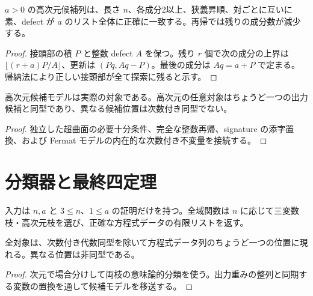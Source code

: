 \begin{theorem}[完全な整数再帰]
\label{thm:higher-enum}
\leanok
$a>0$ の高次元候補列は、長さ $n$、各成分2以上、狭義昇順、対ごとに互いに素、defect が $a$ のリスト全体に正確に一致する。再帰では残りの成分数が減少する。
\end{theorem}
\begin{proof}
\leanok
{}
接頭部の積 $P$ と整数 defect $A$ を保つ。残り $r$ 個で次の成分の上界は $\lfloor(r+a)P/A\rfloor$、更新は $(Pq,Aq-P)$。最後の成分は $Aq=a+P$ で定まる。帰納法により正しい接頭部が全て探索に残ると示す。
\end{proof}

\begin{theorem}[高次元の意味論的分類]
\label{thm:higher-model}
\leanok
高次元候補モデルは実際の対象である。高次元の任意対象はちょうど一つの出力候補と同型であり、異なる候補位置は次数付き同型でない。
\end{theorem}
\begin{proof}
\leanok
{}
独立した超曲面の必要十分条件、完全な整数再帰、signature の添字置換、および Fermat モデルの内在的な次数付き不変量を接続する。
\end{proof}

\section{分類器と最終四定理}

\begin{definition}[公開する全域分類関数]
\label{def:enumerate}
\leanok
{}
入力は $n,a$ と $3\leq n$、$1\leq a$ の証明だけを持つ。全域関数は $n$ に応じて三変数枝・高次元枝を選び、正確な方程式データの有限リストを返す。
\end{definition}

\begin{theorem}[実際の出力方程式への移送]
\label{thm:output}
\leanok
全対象は、次数付き代数同型を除いて方程式データ列のちょうど一つの位置に現れる。異なる位置は非同型である。
\end{theorem}
\begin{proof}
\leanok
{}
次元で場合分けして両枝の意味論的分類を使う。出力重みの整列と同期する変数の置換を通して候補モデルを移送する。
\end{proof}


